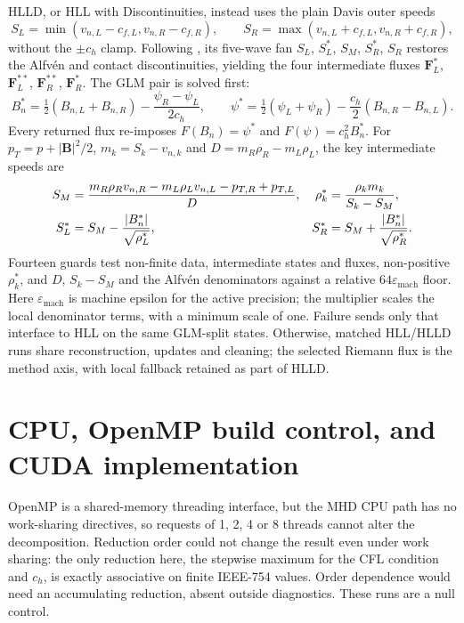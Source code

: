 HLLD, or HLL with Discontinuities, instead uses the plain Davis outer speeds
\begin{equation}
 S_L=\min(v_{n,L}-c_{f,L},v_{n,R}-c_{f,R}),\qquad
 S_R=\max(v_{n,L}+c_{f,L},v_{n,R}+c_{f,R}),
 \label{eq:ch2-hlld-outer-speeds}
\end{equation}
without the $\pm c_h$ clamp. Following \citet{miyoshiKusano2005hlld}, its
five-wave fan $S_L$, $S_L^*$, $S_M$, $S_R^*$, $S_R$ restores the Alfv\'en and
contact discontinuities, yielding the four intermediate fluxes
$\mathbf F_L^*$, $\mathbf F_L^{**}$, $\mathbf F_R^{**}$, $\mathbf F_R^*$.
The GLM pair is solved first:
\begin{equation}
 B_n^*=\tfrac12(B_{n,L}+B_{n,R})-\frac{\psi_R-\psi_L}{2c_h},\qquad
 \psi^*=\tfrac12(\psi_L+\psi_R)-\frac{c_h}{2}(B_{n,R}-B_{n,L}).
 \label{eq:ch2-hlld-glm-star}
\end{equation}
Every returned flux re-imposes $F(B_n)=\psi^*$ and
$F(\psi)=c_h^2B_n^*$. For $p_T=p+|\mathbf B|^2/2$,
$m_k=S_k-v_{n,k}$ and $D=m_R\rho_R-m_L\rho_L$, the key intermediate speeds are
\begin{align}
 S_M&=\frac{m_R\rho_Rv_{n,R}-m_L\rho_Lv_{n,L}-p_{T,R}+p_{T,L}}{D},&
 \rho_k^*&=\frac{\rho_km_k}{S_k-S_M},\notag\\
 S_L^*&=S_M-\frac{|B_n^*|}{\sqrt{\rho_L^*}},&
 S_R^*&=S_M+\frac{|B_n^*|}{\sqrt{\rho_R^*}}.
 \label{eq:ch2-hlld-speeds}
\end{align}
Fourteen guards test non-finite data, intermediate states and fluxes,
non-positive $\rho_k^*$, and $D$, $S_k-S_M$ and the Alfv\'en denominators
against a relative $64\varepsilon_{\mathrm{mach}}$ floor. Here
$\varepsilon_{\mathrm{mach}}$ is machine epsilon for the active precision; the
multiplier scales the local denominator terms, with a minimum scale of one.
Failure sends only
that interface
to HLL on the same GLM-split states. Otherwise, matched HLL/HLLD runs share
reconstruction, updates and cleaning; the selected Riemann flux is the method
axis, with local fallback retained as part of HLLD.

\section{CPU, OpenMP build control, and CUDA implementation}
\label{sec:ch2-execution}

OpenMP is a shared-memory threading interface, but the MHD CPU path has no
work-sharing directives, so requests of 1, 2, 4 or 8 threads cannot alter the
decomposition. Reduction order could not change the result even under work
sharing: the only reduction here, the stepwise maximum for the CFL condition
and $c_h$, is exactly associative on finite IEEE-754 values. Order dependence
would need an accumulating reduction, absent outside diagnostics. These runs
are a null control.

